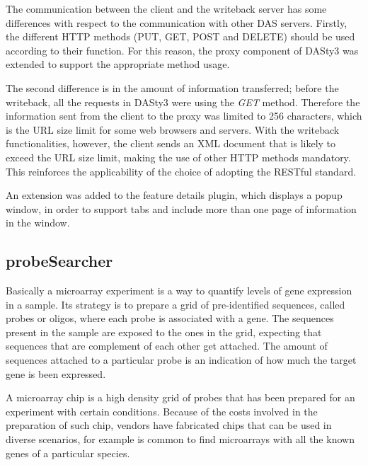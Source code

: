 The communication between the client and the writeback server has some differences with respect to the communication with other DAS servers. Firstly, the different HTTP methods (PUT, GET, POST and DELETE) should be used according to their function. For this reason, the proxy component of DASty3 was extended to support the appropriate method usage. 

The second difference is in the amount of information transferred; before the writeback, all the requests in DASty3 were using the \emph{GET} method. Therefore the information sent from the client to the proxy was limited to 256 characters, which is the URL size limit for some web browsers and servers. With the writeback functionalities, however, the client sends an XML document that is likely to exceed the URL size limit, making the use of other HTTP methods mandatory. This reinforces the applicability of the choice of adopting the RESTful standard. 

An extension was added to the feature details plugin, which displays a popup window, in order to support tabs and include more than one page of information in the window.

\newpage

\subsection{probeSearcher}

Basically a microarray experiment is a way to quantify levels of gene expression in a sample. Its strategy is to prepare a grid of pre-identified sequences, called probes or oligos, where each probe is associated with a gene. The sequences present in the sample are exposed to the ones in the grid, expecting that sequences that are complement of each other get attached. The amount of sequences attached to a particular probe is an indication of how much the target gene is been expressed.

A microarray chip is a high density grid of probes that has been prepared for an experiment with certain conditions. Because of the costs involved in the preparation of such chip, vendors have fabricated chips that can be used in diverse scenarios, for example is common to find microarrays with all the known genes of a particular species.

